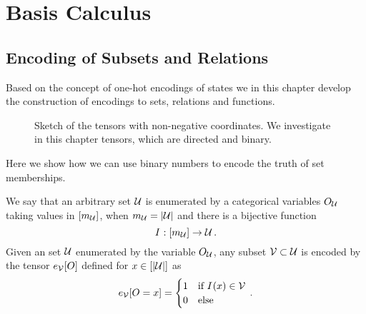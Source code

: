 \section{Basis Calculus}\label{cha:basisCalculus}


\subsection{Encoding of Subsets and Relations}

Based on the concept of one-hot encodings of states we in this chapter develop the construction of encodings to sets, relations and functions.

\begin{figure}[h]
	\begin{center}
		
	\end{center}
	\caption{Sketch of the tensors with non-negative coordinates. 
	We investigate in this chapter tensors, which are directed and binary.}
\end{figure}


Here we show how we can use binary numbers to encode the truth of set memberships.

\begin{definition}\label{def:subsetEncoding}
	We say that an arbitrary set $\mathcal{U}$ is enumerated by a categorical variables $O_{\mathcal{U}}$ taking values in $[m_{\mathcal{U}}]$, when $m_{\mathcal{U}}=\left|\mathcal{U}\right|$ and there is a bijective function
		\[ I^{} : [m_{\mathcal{U}}] \rightarrow \mathcal{U} \, . \]
	Given an set $\mathcal{U}$ enumerated by the variable $O_{\mathcal{U}}$, any subset $\mathcal{V}\subset\mathcal{U}$ is encoded by the tensor $e_{\mathcal{V}}[O]$ defined for $x\in[\left|\mathcal{U}\right|]$ as
	\begin{align}
	 	e_{\mathcal{V}}[O={x}] = \begin{cases}
		1 & \text{if } I^{}(x) \in \mathcal{V} \\
		0 & \text{else}
		\end{cases} \, . 
	\end{align}
\end{definition}

